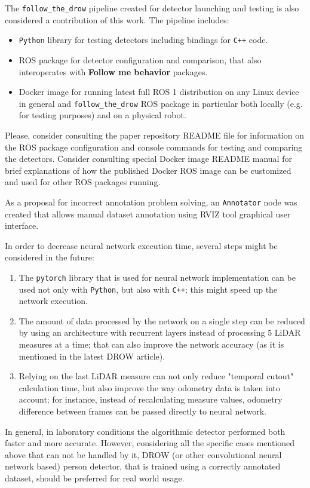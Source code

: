 \documentclass{article}
\begin{document}
The \texttt{follow\_the\_drow} pipeline created for detector launching and testing is also considered a contribution of this work.
The pipeline includes:
\begin{itemize}
    \item \texttt{Python} library for testing detectors including bindings for \texttt{C++} code.
    \item ROS package for detector configuration and comparison, that also interoperates with \textbf{Follow me behavior} packages.
    \item Docker image for running latest full ROS 1 distribution on any Linux device in general and \texttt{follow\_the\_drow} ROS package in particular both locally (e.g. for testing purposes) and on a physical robot.
\end{itemize}

Please, consider consulting the paper repository README file\cite{FTD_repo_readme} for information on the ROS package configuration and console commands for testing and comparing the detectors.
Consider consulting special Docker image README manual\cite{FTD_image_readme} for brief explanations of how the published Docker ROS image can be customized and used for other ROS packages running.

As a proposal for incorrect annotation problem solving, an \texttt{Annotator} node was created that allows manual dataset annotation using RVIZ tool graphical user interface.

In order to decrease neural network execution time, several steps might be considered in the future:
\begin{enumerate}
    \item The \texttt{pytorch} library that is used for neural network implementation can be used not only with \texttt{Python}, but also with \texttt{C++}; this might speed up the network execution.
    \item The amount of data processed by the network on a single step can be reduced by using an architecture with recurrent layers instead of processing 5 LiDAR measures at a time; that can also improve the network accuracy (as it is mentioned in the latest DROW article)\cite{DROW_2018}.
    \item Relying on the last LiDAR measure can not only reduce "temporal cutout" calculation time, but also improve the way odometry data is taken into account; for instance, instead of recalculating measure values, odometry difference between frames can be passed directly to neural network.
\end{enumerate}

In general, in laboratory conditions the algorithmic detector performed both faster and more accurate.
However, considering all the specific cases mentioned above that can not be handled by it, DROW (or other convolutional neural network based) person detector, that is trained using a correctly annotated dataset, should be preferred for real world usage.

\clearpage



\end{document}

